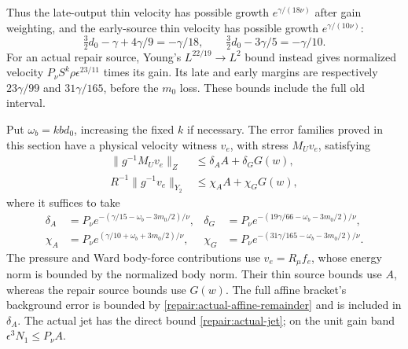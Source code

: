 Thus the late-output thin velocity has possible growth
$e^{\gamma/(18\nu)}$ after gain weighting, and the early-source
thin velocity has possible growth $e^{\gamma/(10\nu)}$:
\[
 \tfrac32d_0-\gamma+4\gamma/9=-\gamma/18,
 \qquad \tfrac32d_0-3\gamma/5=-\gamma/10.
\]
For an actual repair source, Young's $L^{22/19}\to L^2$ bound
instead gives normalized velocity
$P_\nu S^k\rho\epsilon^{23/11}$ times its gain. Its late and early
margins are respectively $23\gamma/99$ and $31\gamma/165$, before
the $m_0$ loss. These bounds include the full old interval.

Put $\omega_b=kbd_0$, increasing the fixed $k$ if necessary.
The error families proved in this section have a physical velocity
witness $v_e$, with stress $M_Uv_e$, satisfying
\begin{align*}
 \|g^{-1}M_Uv_e\|_Z&\le\delta_A A+\delta_G G(w),\\
 R^{-1}\|g^{-1}v_e\|_{Y_2}&\le\chi_A A+\chi_G G(w),
\end{align*}
where it suffices to take
\begin{align*}
 \delta_A&=P_\nu e^{-(\gamma/15-\omega_b-3m_0/2)/\nu},&
 \delta_G&=P_\nu e^{-(19\gamma/66-\omega_b-3m_0/2)/\nu},\\
 \chi_A&=P_\nu e^{(\gamma/10+\omega_b+3m_0/2)/\nu},&
 \chi_G&=P_\nu e^{-(31\gamma/165-\omega_b-3m_0/2)/\nu}.
\end{align*}
The pressure and Ward body-force contributions use $v_e=R_\mu f_e$,
whose energy norm is bounded by the normalized body norm. Their thin
source bounds use $A$, whereas the repair source bounds use $G(w)$.
The full affine bracket's background error is bounded by
\eqref{repair:actual-affine-remainder} and is included in $\delta_A$.
The actual jet has the direct bound \eqref{repair:actual-jet}; on
the unit gain band $\epsilon^3N_1\le P_\nu A$.

